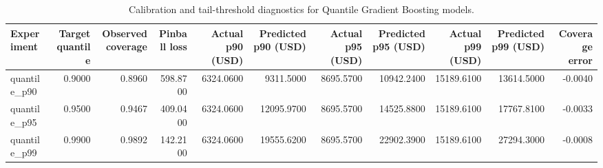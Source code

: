 \begin{table}
\caption{Calibration and tail-threshold diagnostics for Quantile Gradient Boosting models.}
\label{tab:06-gb-quantile-results}
\begin{tabular}{lrrrrrrrrrr}
\toprule
Experiment & Target quantile & Observed coverage & Pinball loss & Actual p90 (USD) & Predicted p90 (USD) & Actual p95 (USD) & Predicted p95 (USD) & Actual p99 (USD) & Predicted p99 (USD) & Coverage error \\
\midrule
quantile_p90 & 0.9000 & 0.8960 & 598.8700 & 6324.0600 & 9311.5000 & 8695.5700 & 10942.2400 & 15189.6100 & 13614.5000 & -0.0040 \\
quantile_p95 & 0.9500 & 0.9467 & 409.0400 & 6324.0600 & 12095.9700 & 8695.5700 & 14525.8800 & 15189.6100 & 17767.8100 & -0.0033 \\
quantile_p99 & 0.9900 & 0.9892 & 142.2100 & 6324.0600 & 19555.6200 & 8695.5700 & 22902.3900 & 15189.6100 & 27294.3000 & -0.0008 \\
\bottomrule
\end{tabular}
\end{table}
